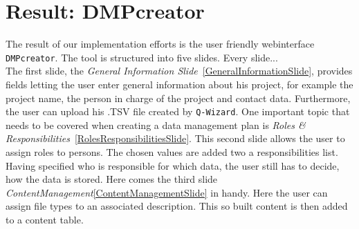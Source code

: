 
\section{Result: DMPcreator}
The result of our implementation efforts is the user friendly webinterface \texttt{DMPcreator}. The tool is structured into five slides. Every slide...\\
The first slide, the \textit{General Information Slide}~\ref{GeneralInformationSlide}, provides fields letting the user enter general information about his project, for example the project name, the person in charge of the project and contact data. Furthermore, the user can upload his .TSV file created by \texttt{Q-Wizard}. One important topic that needs to be covered when creating a data management plan is \textit{Roles \& Responsibilities}~\ref{RolesResponsibilitiesSlide}. This second slide allows the user to assign roles to persons. The chosen values are added two a responsibilities list. Having specified who is responsible for which data, the user still has to decide, how the data is stored. Here comes the third slide \textit{ContentManagement}\ref{ContentManagementSlide} in handy. Here the user can assign file types to an associated description. This so built content is then added to a content table.
